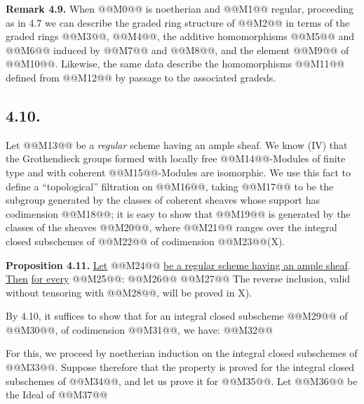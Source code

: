 \textbf{Remark 4.9.} When @@M0@@ is noetherian and @@M1@@ regular, proceeding as in 4.7 we can describe the graded ring structure of @@M2@@ in terms of the graded rings @@M3@@, @@M4@@, the additive homomorphisms @@M5@@ and @@M6@@ induced by @@M7@@ and @@M8@@, and the element @@M9@@ of @@M10@@. Likewise, the same data describe the homomorphisms @@M11@@ defined from @@M12@@ by passage to the associated gradeds.

\subsection*{4.10.}

Let @@M13@@ be a \emph{regular} scheme having an ample sheaf. We know (IV\qquad) that the Grothendieck groups formed with locally free @@M14@@-Modules of finite type and with coherent @@M15@@-Modules are isomorphic. We use this fact to define a ``topological'' filtration on @@M16@@, taking @@M17@@ to be the subgroup generated by the classes of coherent sheaves whose support has codimension @@M18@@; it is easy to show that @@M19@@ is generated by the classes of the sheaves @@M20@@, where @@M21@@ ranges over the integral closed subschemes of @@M22@@ of codimension @@M23@@(X\qquad).

\textbf{Proposition 4.11.} \uline{Let} @@M24@@ \uline{be a regular scheme having an ample sheaf}. \uline{Then} \uline{for every} @@M25@@:
@@M26@@
@@M27@@ The reverse inclusion, valid without tensoring with @@M28@@, will be proved in X\qquad).

By 4.10, it suffices to show that for an integral closed subscheme @@M29@@ of @@M30@@, of codimension @@M31@@, we have:
@@M32@@

For this, we proceed by noetherian induction on the integral closed subschemes of @@M33@@. Suppose therefore that the property is proved for the integral closed subschemes of @@M34@@, and let us prove it for @@M35@@. Let @@M36@@ be the Ideal of @@M37@@
